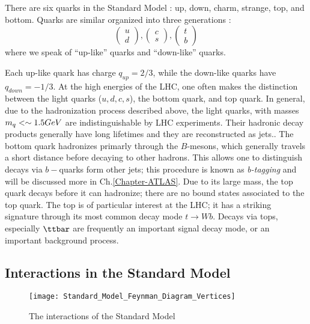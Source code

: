 There are six quarks in the Standard Model : up, down, charm, strange, top, and bottom.
Quarks are similar organized into three generations :
\begin{equation}
\begin{pmatrix} u \\ d \end{pmatrix} , \begin{pmatrix} c \\ s \end{pmatrix}, \begin{pmatrix} t \\ b \end{pmatrix}
\end{equation}
where we speak of ``up-like'' quarks and ``down-like'' quarks.

Each up-like quark has charge $q_{up} = 2/3$, while the down-like quarks have $q_{down} = -1/3$.
At the high energies of the LHC, one often makes the distinction between the light quarks ($u,d,c,s$), the bottom quark, and top quark.
In general, due to the hadronization process described above, the light quarks, with masses $m_q <\sim 1.5 GeV$ are indistinguishable by LHC experiments.
Their hadronic decay products generally have long lifetimes and they are reconstructed as jets.\footnotemark.
The bottom quark hadronizes primarly through the $B$-mesons, which generally travels a short distance before decaying to other hadrons.
This allows one to distinguish decays via $b-$quarks form other jets; this procedure is known as \textit{b-tagging} and will be discussed more in Ch.\ref{Chapter-ATLAS}.
Due to its large mass, the top quark decays before it can hadronize; there are no bound states associated to the top quark.
The top is of particular interest at the LHC; it has a striking signature through its most common decay mode $t \rightarrow Wb$.
Decays via tops, especially $\ttbar$ are frequently an important signal decay mode, or an important background process.

\subsection{Interactions in the Standard Model}
\begin{figure}
\caption{The interactions of the Standard Model} \label{fig:sm_interactions}
\texttt{[image: Standard\_Model\_Feynman\_Diagram\_Vertices]}
\end{figure}

